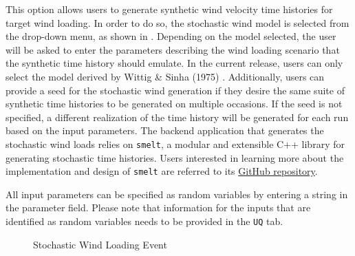 This option allows users to generate synthetic wind velocity time
histories for target wind loading. In order to do so, the stochastic
wind model is selected from the drop-down menu, as shown in
. Depending on the model selected, the
user will be asked to enter the parameters describing the wind loading
scenario that the synthetic time history should emulate. In the
current release, users can only select the model derived by Wittig \&
Sinha (1975) \cite{wittig1975simulation}. Additionally, users can
provide a seed for the stochastic wind generation if they desire the
same suite of synthetic time histories to be generated on multiple occasions.
If the seed is not specified, a different realization of the time
history will be generated for each run based on the input
parameters. The backend application that generates the stochastic
wind loads relies on \texttt{smelt}, a modular and extensible C++
library for generating stochastic time histories. Users interested in
learning more about the implementation and design of \texttt{smelt}
are referred to its
\href{https://github.com/NHERI-SimCenter/smelt}{GitHub repository}.

All input parameters can be specified as random variables by entering
a string in the parameter field. Please note that information for the
inputs that are identified as random variables needs to be provided in
the \texttt{UQ} tab.

\begin{figure}[!htbp]
  \caption{Stochastic Wind Loading Event}
  \label{fig:stochastic_wind_loading}
\end{figure}
